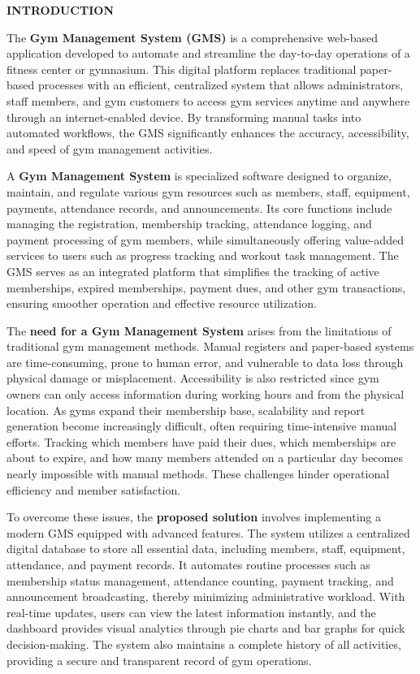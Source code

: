 \documentclass[12pt,a4paper]{report}
\begin{document}
\newpage
\vspace*{\fill}
\begin{center}
{\LARGE \textbf{INTRODUCTION}}
\end{center}
\vspace*{\fill}

\newpage
The \textbf{Gym Management System (GMS)} is a comprehensive web-based application developed to automate and streamline the day-to-day operations of a fitness center or gymnasium. This digital platform replaces traditional paper-based processes with an efficient, centralized system that allows administrators, staff members, and gym customers to access gym services anytime and anywhere through an internet-enabled device. By transforming manual tasks into automated workflows, the GMS significantly enhances the accuracy, accessibility, and speed of gym management activities.

A \textbf{Gym Management System} is specialized software designed to organize, maintain, and regulate various gym resources such as members, staff, equipment, payments, attendance records, and announcements. Its core functions include managing the registration, membership tracking, attendance logging, and payment processing of gym members, while simultaneously offering value-added services to users such as progress tracking and workout task management. The GMS serves as an integrated platform that simplifies the tracking of active memberships, expired memberships, payment dues, and other gym transactions, ensuring smoother operation and effective resource utilization.

The \textbf{need for a Gym Management System} arises from the limitations of traditional gym management methods. Manual registers and paper-based systems are time-consuming, prone to human error, and vulnerable to data loss through physical damage or misplacement. Accessibility is also restricted since gym owners can only access information during working hours and from the physical location. As gyms expand their membership base, scalability and report generation become increasingly difficult, often requiring time-intensive manual efforts. Tracking which members have paid their dues, which memberships are about to expire, and how many members attended on a particular day becomes nearly impossible with manual methods. These challenges hinder operational efficiency and member satisfaction.

To overcome these issues, the \textbf{proposed solution} involves implementing a modern GMS equipped with advanced features. The system utilizes a centralized digital database to store all essential data, including members, staff, equipment, attendance, and payment records. It automates routine processes such as membership status management, attendance counting, payment tracking, and announcement broadcasting, thereby minimizing administrative workload. With real-time updates, users can view the latest information instantly, and the dashboard provides visual analytics through pie charts and bar graphs for quick decision-making. The system also maintains a complete history of all activities, providing a secure and transparent record of gym operations.
\end{document}
